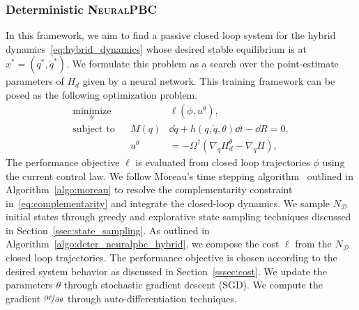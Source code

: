 \subsubsection{Deterministic \textsc{NeuralPBC}}
\label{sssec:data_driven_neuralpbc}

In this framework, we aim to find a passive closed loop system for the hybrid
dynamics~\eqref{eq:hybrid_dynamics} whose desired stable equilibrium is at
$x^* = (q^*, \dot{q}^*)$.
%
We formulate this problem as a search over the point-estimate parameters of
$H_d$ given by a neural network.
%
This training framework can be posed as the following optimization problem. 
\begin{equation}
    \begin{aligned}
        \underset{\theta}{\textrm{minimize}} 
        & & &\ell \left(\phi,u^{\theta}\right)  , \\%
        \textrm{subject to}
        & & M(q) &\dd \dot{q} + h(q, \dot{q}, \theta)\dd t - \dd R  = 0,\\%
        & & u^{\theta} &= -\Omega^{\dagger} (\nabla_q H_d^{\theta} - \nabla_q H),%
    \end{aligned}
    \label{eq:hybrid_neuralpbc}
\end{equation}
%
The performance objective $\ell$ is evaluated from closed loop trajectories
$\phi$ using the current control law.
%
We follow Moreau's time stepping algorithm~\cite{glocker2005formulation}
outlined in Algorithm~\eqref{algo:moreau} to resolve the complementarity
constraint in~\eqref{eq:complementarity} and integrate the closed-loop dynamics.
%
We sample $N_{\mathcal{D}}$ initial states through greedy and explorative state
sampling techniques discussed in Section~\ref{ssec:state_sampling}. As outlined
in Algorithm~\ref{algo:deter_neuralpbc_hybrid}, we compose the cost $\ell$ from
the $N_{\mathcal{D}}$ closed loop trajectories. The performance objective is
chosen according to the desired system behavior as discussed in
Section~\ref{sssec:cost}. We update the parameters $\theta$ through stochastic
gradient descent (SGD). 
%
We compute the gradient $\nicefrac{\partial \ell}{\partial \theta}$ through
auto-differentiation techniques.
%

